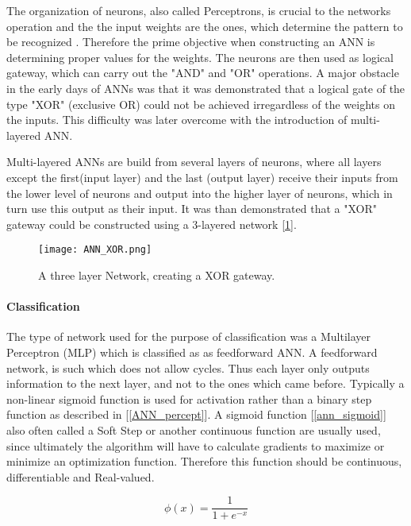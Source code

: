 	The organization of neurons, also called Perceptrons, is crucial to the networks operation and the the input weights are the ones, which determine the pattern to be recognized \cite{bishop1995neural}. Therefore the prime objective when constructing an ANN is determining proper values for the weights. The neurons are then used as logical gateway, which can carry out the "AND" and "OR" operations. A major obstacle in the early days of ANNs was that it was demonstrated that a logical gate of the type "XOR" (exclusive OR) could not be achieved irregardless of the weights on the inputs. This difficulty was later overcome with the introduction of multi-layered ANN.
	
	Multi-layered ANNs are build from several layers of neurons, where all layers except the first(input layer) and the last (output layer) receive their inputs from the lower level of neurons and output into the higher layer of neurons, which in turn use this output as their input. It was than demonstrated that a "XOR" gateway could be constructed using a 3-layered network [\ref{ANN_XOR}].
	
	\begin{figure}[h]
		\centering
		\captionsetup{width=0.8\textwidth}
		\texttt{[image: ANN\_XOR.png]}
		\caption[ANN XOR Perceptron-Network]{
			\footnotesize{
				A three layer Network, creating a XOR gateway.
			}
		} 
		\label{ANN_XOR}
	\end{figure}	
	
	
	\paragraph{Classification}
		The type of network used for the purpose of classification was a Multilayer Perceptron (MLP) which is classified as as feedforward ANN. A feedforward network, is such which does not allow cycles. Thus each layer only outputs information to the next layer, and not to the ones which came before. Typically a non-linear sigmoid function is used for activation rather than a binary step function as described in [\ref{ANN_percept}]. A sigmoid function [\ref{ann_sigmoid}] also often called a Soft Step or another continuous function are usually used, since ultimately the algorithm will have to calculate gradients to maximize or minimize an optimization function. Therefore this function should be continuous, differentiable and Real-valued.
		
		\begin{equation}
			\phi(x) = \frac{1}{1+ e^{-x}}
			\label{ann_sigmoid}
		\end{equation}
			

